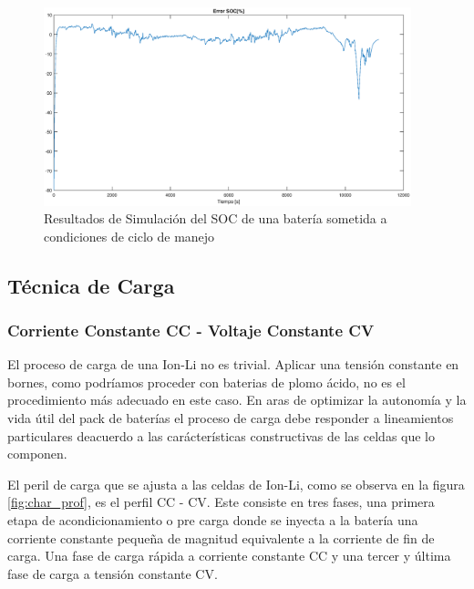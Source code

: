 \documentclass[10pt,a4paper]{article}
\begin{document}
\begin{figure}[h!]
    \begin{center}
	\includegraphics[width=0.95\textwidth]{soc_error_porc.eps}
	\caption{Resultados de Simulación del SOC de una batería sometida a
	condiciones de ciclo de manejo}
	\label{error_SOC_Sim}
    \end{center}
\end{figure}
\FloatBarrier

\subsection{Técnica de Carga} 
\subsubsection{Corriente Constante CC - Voltaje Constante CV}

El proceso de carga de una \acrfull{Ion-Li} no es trivial. Aplicar una tensión
constante en  bornes, como podríamos proceder con baterias de plomo ácido, no es
el procedimiento más adecuado en este caso. En aras de optimizar la autonomía y
la vida útil del pack de baterías el proceso de carga debe responder a
lineamientos particulares deacuerdo a las carácterísticas constructivas de las
celdas que lo componen.

El peril de carga que se ajusta a las celdas de \acrshort{Ion-Li}, como se
observa en la figura \ref{fig:char_prof}, es el perfil \acrfull{CC} -
\acrfull{CV}. Este consiste en tres fases, una primera etapa de
acondicionamiento o pre carga donde se inyecta a la batería una corriente
constante pequeña de magnitud equivalente a la corriente de fin de carga. Una
fase de carga rápida a corriente constante \acrshort{CC} y una tercer y última
fase de carga a tensión constante \acrshort{CV}.
\end{document}
